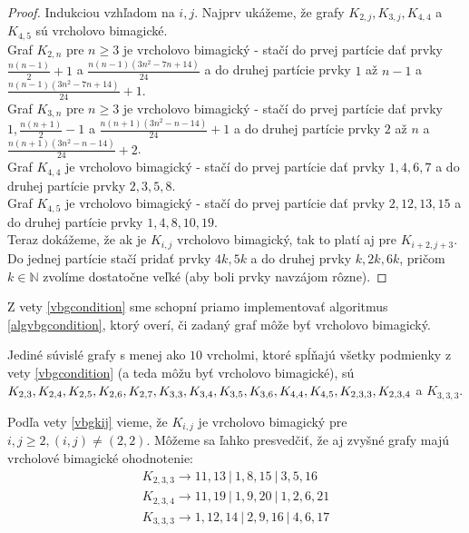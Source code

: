 \begin{proof} Indukciou vzhľadom na $i,j$. Najprv ukážeme, že grafy $K_{2,j}, K_{3,j}, K_{4,4}$ a $K_{4,5}$ sú vrcholovo bimagické. \\

Graf $K_{2,n}$ pre $n \geq 3$ je vrcholovo bimagický - stačí do prvej partície dať prvky $\frac{n(n-1)}{2} + 1$ a $\frac{n(n-1)(3n^2 - 7n + 14)}{24}$ a do druhej partície prvky $1$ až $n - 1$ a $\frac{n(n-1)(3n^2 - 7n + 14)}{24} + 1$. \\

Graf $K_{3,n}$ pre $n \geq 3$ je vrcholovo bimagický - stačí do prvej partície dať prvky $1, \frac{n(n+1)}{2} - 1$ a $\frac{n(n+1)(3n^2 - n - 14)}{24} + 1$ a do druhej partície prvky $2$ až $n$ a $\frac{n(n+1)(3n^2 - n - 14)}{24} + 2$. \\

Graf $K_{4,4}$ je vrcholovo bimagický - stačí do prvej partície dať prvky $1, 4, 6, 7$ a do druhej partície prvky $2, 3, 5, 8$. \\

Graf $K_{4,5}$ je vrcholovo bimagický - stačí do prvej partície dať prvky $2, 12, 13, 15$ a do druhej partície prvky $1, 4, 8, 10, 19$. \\

Teraz dokážeme, že ak je $K_{i,j}$ vrcholovo bimagický, tak to platí aj pre $K_{i+2,j+3}$. Do jednej partície stačí pridať prvky $4k, 5k$ a do druhej prvky $k, 2k, 6k$, pričom $k \in \mathbb{N}$ zvolíme dostatočne veľké (aby boli prvky navzájom rôzne).
\end{proof}

Z vety \ref{vbgcondition} sme schopní priamo implementovať algoritmus \ref{algvbgcondition}, ktorý overí, či zadaný graf môže byť vrcholovo bimagický. 

\begin{result} Jediné súvislé grafy s menej ako $10$ vrcholmi, ktoré spĺňajú všetky podmienky z vety \ref{vbgcondition} (a teda môžu byť vrcholovo bimagické), sú $K_{2,3}, K_{2,4}, K_{2,5}, K_{2,6}, K_{2,7}, \\
 K_{3,3}, K_{3,4}, K_{3,5}, K_{3,6}, K_{4,4}, K_{4,5}, K_{2,3,3}, K_{2,3,4}$ a $K_{3,3,3}$.
\end{result}

Podľa vety \ref{vbgkij} vieme, že $K_{i,j}$ je vrcholovo bimagický pre $i,j \geq 2, (i,j) \neq (2,2)$. Môžeme sa ľahko presvedčiť, že aj zvyšné grafy majú vrcholové bimagické ohodnotenie:
\begin{gather*}
K_{2,3,3} \rightarrow 11, 13 ~|~ 1, 8, 15 ~|~ 3, 5, 16 \\
K_{2,3,4} \rightarrow 11, 19 ~|~ 1, 9, 20 ~|~ 1, 2, 6, 21 \\
K_{3,3,3} \rightarrow 1, 12, 14 ~|~ 2, 9, 16 ~|~ 4, 6, 17
\end{gather*}

